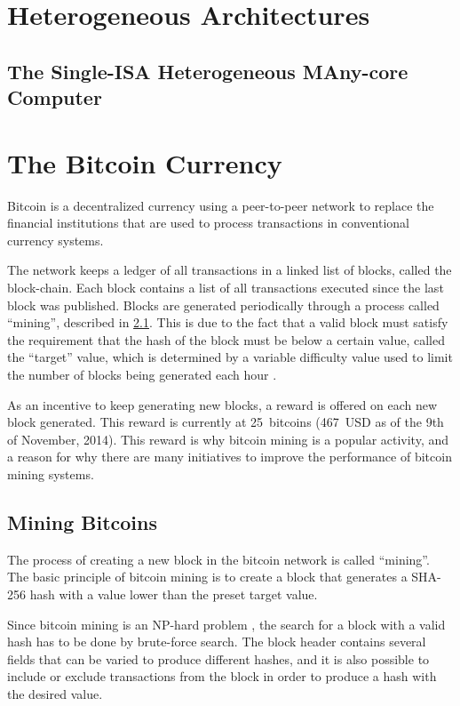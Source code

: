 \section{Heterogeneous Architectures}
\label{sec:heterogeneous}

\subsection{The Single-ISA Heterogeneous MAny-core Computer}
\label{sec:shmac}

\section{The Bitcoin Currency}
\label{sec:bitcoins}
Bitcoin is a decentralized currency using a peer-to-peer network to replace
the financial institutions that are used to process transactions in conventional
currency systems.

The network keeps a ledger of all transactions in a linked list of blocks, called the
block-chain. Each block contains a list of all transactions executed since the last
block was published. Blocks are generated periodically through a process
called ``mining'', described in \ref{sec:bitcoin-mining}. This is due to the fact that
a valid block must satisfy the requirement that the hash of the block must be below a certain value,
called the ``target'' value, which is determined by a variable difficulty value used to limit the number
of blocks being generated each hour \cite{bitcoin}.

As an incentive to keep generating new blocks, a reward is offered on each new block
generated. This reward is currently at 25~bitcoins (467~USD as of the 9th of November, 2014).
This reward is why bitcoin mining is a popular activity, and a reason for why
there are many initiatives to improve the performance of bitcoin mining systems.

\subsection{Mining Bitcoins}
\label{sec:bitcoin-mining}
The process of creating a new block in the bitcoin network is called ``mining''. The basic
principle of bitcoin mining is to create a block that generates a SHA-256 hash with
a value lower than the preset target value.

Since bitcoin mining is an NP-hard problem \cite{bitcoin-np}, the search for a block with a valid
hash has to be done by brute-force search. The block header contains several fields
that can be varied to produce different hashes, and it is also possible to include
or exclude transactions from the block in order to produce a hash with the desired
value.

